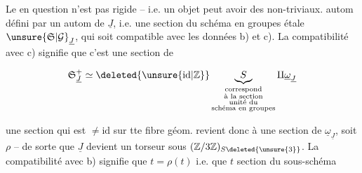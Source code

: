 

Le   en question n'est pas rigide -- i.e. un objet peut avoir des  non-triviaux.   autom   défini par un autom de $\underline J$, i.e. une section du schéma en groupes étale $\unsure{\mathfrak S|\mathcal G}_{\underline J}$, qui soit compatible avec les données b) et c). La compatibilité avec c) signifie que c'est une section de

\[
\mathfrak S_{\underline J}^{+}\simeq\deleted{\unsure{\mathrm{id}|\mathbb Z}}
\underbrace{S}_{\substack{\text{correspond}\\\text{à la section}\\\text{unité du}\\\text{schéma en groupes}}}
\amalg\underline\omega_{\underline J}
\]

une section qui est $\ne\mathrm{id}$ sur tte fibre géom. revient donc à une section de $\underline\omega_{\underline J}$, soit $\rho$ -- de sorte que $\underline J$ devient un torseur sous $(\mathbb Z/3\mathbb Z)_{S\deleted{\unsure{3}}}$. La compatibilité avec b) signifie que $t=\rho(t)$ i.e. que $t$   section du sous-schéma


